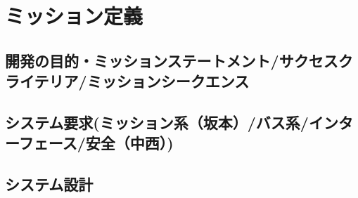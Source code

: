 \chapter{ミッション定義}
\label{chap:mission}

%

\section{開発の目的・ミッションステートメント/サクセスクライテリア/ミッションシークエンス}

\section{システム要求(ミッション系（坂本）/バス系/インターフェース/安全（中西）)}

\section{システム設計}
